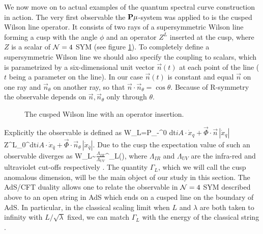 We now move on to actual examples of the quantum spectral curve construction in action.
The very first observable the ${\bf P}\mu$-system was applied to is the cusped Wilson line operator.
It consists of two rays of a supersymmetric Wilson line forming a cusp with the angle $\phi$ and an operator $Z^L$ inserted at the cusp, where $Z$ is a scalar of ${\cal N}=4$ SYM (see figure \ref{fig:wilson_line}). 
To completely define a supersymmetric Wilson line we should also specify the coupling to scalars, which is parametrized by a six-dimensional unit vector $\vec n(t)$ at each point of the line ($t$ being a parameter on the line). 
In our case $\vec n(t)$ is constant and equal $\vec n$ on one ray and $\vec n_\theta$ on another ray, so that $\vec n\cdot \vec n_\theta=\cos\theta$. 
Because of R-symmetry the observable depends on $\vec n,\vec n_\theta$ only through $\theta$.
\begin{figure}[t]
\centering
{}
\caption{The cusped Wilson line with an operator insertion.}
\label{fig:wilson_line}
\end{figure}
Explicitly the observable is defined as
\beq
\label{WilsL}
	W_L={\rm P}\exp\!\int\limits_{-\infty}^0\! dt\(i  A\cdot\dot{x}_q+\vec\Phi\cdot\vec n\,|\dot x_q|\)\times Z^L\exp\!\int\limits_0^\infty\!dt\(i A\cdot\dot x_{\bar q}+\vec\Phi\cdot\vec n_\theta\,|\dot x_{\bar q}|\).
\eeq
Due to the cusp the expectation value of such an observable diverges as
\beq
\left\langle W_L\right\rangle \sim \(\frac{\Lambda_{IR}}{\Lambda_{UV}}\)^{\Gamma_L(\lambda)},
\eeq
where $\Lambda_{IR}$ and $\Lambda_{UV}$ are the infra-red and ultraviolet cut-offs respectively \cite{Polyakov:1980ca,Correa:2012at}. 
The quantity $\Gamma_{L}$, which we will call the cusp anomalous dimension, will be the main object of our study in this section.
The AdS/CFT duality allows one to relate the observable in ${\cal N}=4$ SYM described above to an open string in AdS which ends on a cusped line on the boundary of AdS. In particular, in the classical scaling limit when $L$ and $\lambda$ are both taken to infinity with $L/\sqrt{\lambda}$ fixed, we can match $\Gamma_{L}$ with the energy of the classical string \cite{Correa:2012hh, Gromov:2012eu}.

